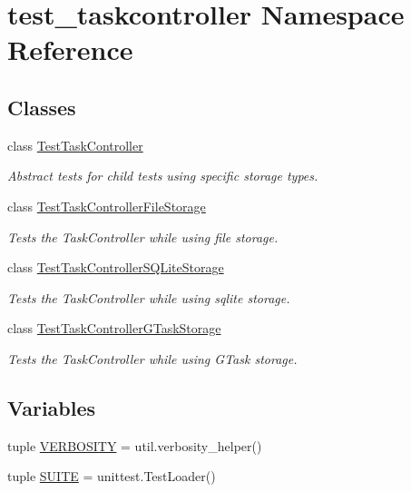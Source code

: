 \hypertarget{namespacetest__taskcontroller}{
\section{test\-\_\-taskcontroller \-Namespace \-Reference}
\label{namespacetest__taskcontroller}
}
\subsection*{\-Classes}
\begin{DoxyCompactItemize}
\item 
class \hyperlink{classtest__taskcontroller_1_1TestTaskController}{\-Test\-Task\-Controller}
\begin{DoxyCompactList}\small\item\em \-Abstract tests for child tests using specific storage types. \end{DoxyCompactList}\item 
class \hyperlink{classtest__taskcontroller_1_1TestTaskControllerFileStorage}{\-Test\-Task\-Controller\-File\-Storage}
\begin{DoxyCompactList}\small\item\em \-Tests the \-Task\-Controller while using file storage. \end{DoxyCompactList}\item 
class \hyperlink{classtest__taskcontroller_1_1TestTaskControllerSQLiteStorage}{\-Test\-Task\-Controller\-S\-Q\-Lite\-Storage}
\begin{DoxyCompactList}\small\item\em \-Tests the \-Task\-Controller while using sqlite storage. \end{DoxyCompactList}\item 
class \hyperlink{classtest__taskcontroller_1_1TestTaskControllerGTaskStorage}{\-Test\-Task\-Controller\-G\-Task\-Storage}
\begin{DoxyCompactList}\small\item\em \-Tests the \-Task\-Controller while using \-G\-Task storage. \end{DoxyCompactList}\end{DoxyCompactItemize}
\subsection*{\-Variables}
\begin{DoxyCompactItemize}
\item 
tuple \hyperlink{namespacetest__taskcontroller_ab27699669a3b6b329f7a9168986ed220}{\-V\-E\-R\-B\-O\-S\-I\-T\-Y} = util.\-verbosity\-\_\-helper()
\item 
tuple \hyperlink{namespacetest__taskcontroller_a645b893cfab7774471762f6d86ff22e6}{\-S\-U\-I\-T\-E} = unittest.\-Test\-Loader()
\end{DoxyCompactItemize}


